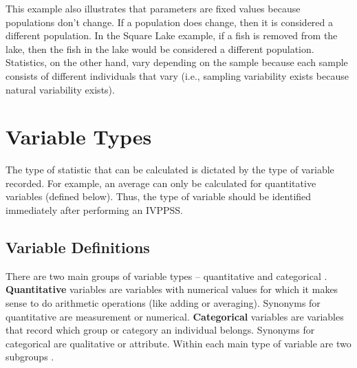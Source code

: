 \documentclass[10pt,openany]{book}\usepackage[]{graphicx}\usepackage[]{color}
\begin{document}

This example also illustrates that parameters are fixed values because populations don't change. If a population does change, then it is considered a different population. In the Square Lake example, if a fish is removed from the lake, then the fish in the lake would be considered a different population. Statistics, on the other hand, vary depending on the sample because each sample consists of different individuals that vary (i.e., sampling variability exists because natural variability exists).



\section{Variable Types}\label{sect:VarTypes}
The type of statistic that can be calculated is dictated by the type of variable recorded. For example, an average can only be calculated for quantitative variables (defined below). Thus, the type of variable should be identified immediately after performing an IVPPSS.

\subsection{Variable Definitions}
There are two main groups of variable types -- quantitative and categorical . \textbf{Quantitative} variables are variables with numerical values for which it makes sense to do arithmetic operations (like adding or averaging).  Synonyms for quantitative are measurement or numerical. \textbf{Categorical} variables are variables that record which group or category an individual belongs.  Synonyms for categorical are qualitative or attribute. Within each main type of variable are two subgroups .
\end{document}
